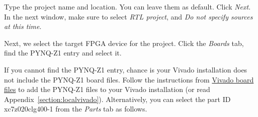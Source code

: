 \documentclass[11pt]{article}
\begin{document}
\begin{center}
\end{center}

Type the project name and location. You can leave them as default. Click \emph{Next}. In the next window, make sure to select \emph{RTL project}, and \emph{Do not specify sources at this time}.

\begin{center}
\end{center}

Next, we select the target FPGA device for the project. Click the \emph{Boards} tab, find the PYNQ-Z1 entry and select it.

\begin{center}
\end{center}

If you cannot find the PYNQ-Z1 entry, chance is your Vivado installation does not include the PYNQ-Z1 board files. Follow the instructions from \href{https://pynq.readthedocs.io/en/v2.3/overlay_design_methodology/board_settings.html#vivado-board-files}{Vivado board files} to add the PYNQ-Z1 files to your Vivado installation (or read Appendix~\ref{section:localvivado}).
Alternatively, you can select the part ID xc7z020clg400-1 from the \emph{Parts} tab as follows.
\end{document}
